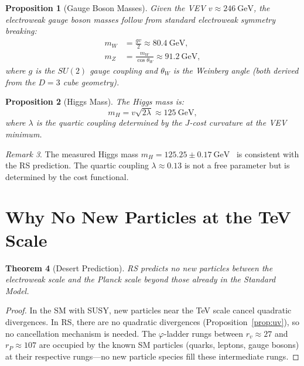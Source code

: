 \documentclass[12pt,a4paper]{article}
\newtheorem{theorem}{Theorem}[section]
\newtheorem{proposition}[theorem]{Proposition}
\theoremstyle{definition}
\theoremstyle{remark}
\newtheorem{remark}[theorem]{Remark}
\begin{document}
\begin{proposition}[Gauge Boson Masses]
\label{prop:gauge}
Given the VEV $v \approx 246~\mathrm{GeV}$, the
electroweak gauge boson masses follow from standard
electroweak symmetry breaking:
\begin{align}
  m_W &= \frac{g v}{2}
  \approx 80.4~\mathrm{GeV}, \\
  m_Z &= \frac{m_W}{\cos\theta_W}
  \approx 91.2~\mathrm{GeV},
\end{align}
where $g$ is the $SU(2)$ gauge coupling and $\theta_W$ is
the Weinberg angle (both derived from the $D = 3$ cube
geometry).
\end{proposition}

\begin{proposition}[Higgs Mass]
\label{prop:higgs}
The Higgs mass is:
\begin{equation}
  m_H = v\sqrt{2\lambda} \approx 125~\mathrm{GeV},
\end{equation}
where $\lambda$ is the quartic coupling determined by the
$J$-cost curvature at the VEV minimum.
\end{proposition}

\begin{remark}
The measured Higgs mass
$m_H = 125.25 \pm 0.17~\mathrm{GeV}$~\cite{ATLAS2012} is
consistent with the RS prediction.  The quartic coupling
$\lambda \approx 0.13$ is not a free parameter but is
determined by the cost functional.
\end{remark}

\section{Why No New Particles at the TeV Scale}
\label{sec:no-new}

\begin{theorem}[Desert Prediction]
\label{thm:desert}
RS predicts no new particles between the electroweak scale
and the Planck scale beyond those already in the Standard
Model.
\end{theorem}

\begin{proof}
In the SM with SUSY, new particles near the TeV scale
cancel quadratic divergences.  In RS, there are no
quadratic divergences (Proposition~\ref{prop:uv}), so no
cancellation mechanism is needed.  The $\varphi$-ladder
rungs between $r_v \approx 27$ and $r_P \approx 107$ are
occupied by the known SM particles (quarks, leptons, gauge
bosons) at their respective rungs---no new particle species
fill these intermediate rungs.
\end{proof}
\end{document}
